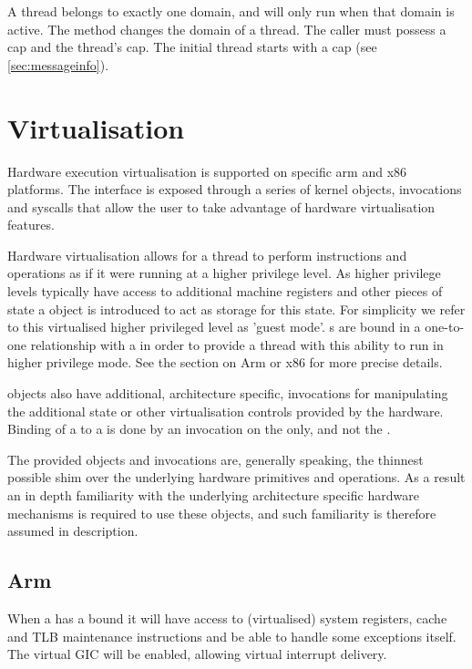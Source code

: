 A thread belongs to exactly one domain, and will only run when that domain
is active.
The  method changes the domain
of a thread.
The caller must possess a  cap and the thread's  cap.
The initial thread starts with a  cap (see
\autoref{sec:messageinfo}).

\section{Virtualisation}
\label{sec:virt}

Hardware execution virtualisation is supported on specific arm and x86 platforms. The interface is exposed through a series
of kernel objects, invocations and syscalls that allow the user to take advantage of hardware
virtualisation features.

Hardware virtualisation allows for a thread to perform instructions and operations as if it were
running at a higher privilege level. As higher privilege levels typically have access to
additional machine registers and other pieces of state a  object is introduced to act
as storage for this state. For simplicity we refer to this virtualised higher privileged level as
'guest mode'. s are bound in a one-to-one relationship with a  in order
to provide a thread with this ability to run in higher privilege mode. See the section on
Arm or x86 for more precise details.

 objects also have additional, architecture specific, invocations for manipulating
the additional state or other virtualisation controls provided by the hardware. Binding of
a  to a  is done by an invocation on the  only, and not the .

The provided objects and invocations are, generally speaking, the thinnest possible shim over
the underlying hardware primitives and operations. As a result an in depth familiarity with
the underlying architecture specific hardware mechanisms is required to use these objects, and
such familiarity is therefore assumed in description.

\subsection{Arm}
\label{sec:virt-arm}

When a  has a bound  it will have access to (virtualised) system registers,
cache and TLB maintenance instructions and be able to handle some exceptions itself.
The virtual GIC will be enabled, allowing virtual interrupt delivery.

